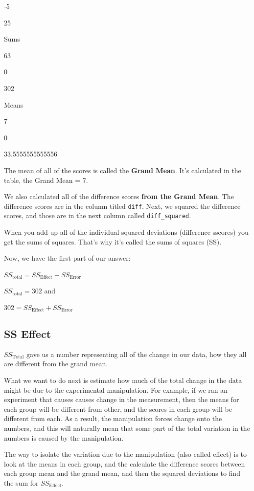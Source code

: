 \documentclass[
]{book}
\begin{document}
-5

25

Sums

63

0

302

Means

7

0

33.5555555555556

The mean of all of the scores is called the \textbf{Grand Mean}. It's calculated in the table, the Grand Mean = 7.

We also calculated all of the difference scores \textbf{from the Grand Mean}. The difference scores are in the column titled \texttt{diff}. Next, we squared the difference scores, and those are in the next column called \texttt{diff\_squared}.

When you add up all of the individual squared deviations (difference sscores) you get the sums of squares. That's why it's called the sums of squares (SS).

Now, we have the first part of our answer:

\(SS_\text{total} = SS_\text{Effect} + SS_\text{Error}\)

\(SS_\text{total} = 302\) and

\(302 = SS_\text{Effect} + SS_\text{Error}\)

\hypertarget{ss-effect}{%
\subsection{SS Effect}\label{ss-effect}}

\(SS_\text{Total}\) gave us a number representing all of the change in our data, how they all are different from the grand mean.

What we want to do next is estimate how much of the total change in the data might be due to the experimental manipulation. For example, if we ran an experiment that causes causes change in the measurement, then the means for each group will be different from other, and the scores in each group will be different from each. As a result, the manipulation forces change onto the numbers, and this will naturally mean that some part of the total variation in the numbers is caused by the manipulation.

The way to isolate the variation due to the manipulation (also called effect) is to look at the means in each group, and the calculate the difference scores between each group mean and the grand mean, and then the squared deviations to find the sum for \(SS_\text{Effect}\).
\end{document}
